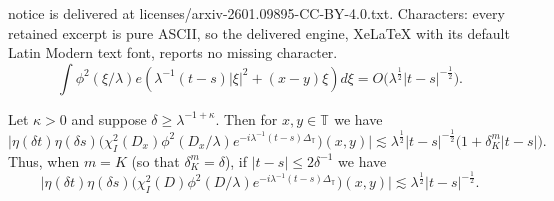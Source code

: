 \documentclass[10pt,a4paper]{amsart}
\newcommand{\T}[1][]{\mathbb{T}^#1}
\newcommand{\dK}[1]{\delta_{K}^{#1}}
\newcommand{\laplac}[1]{\Delta_{#1}}
\newcommand{\la}{\lambda}
\begin{document}
notice is delivered at licenses/arxiv-2601.09895-CC-BY-4.0.txt. Characters: every retained excerpt is pure ASCII, so the delivered engine, XeLaTeX with its default Latin Modern text font, reports no missing character.
\begin{equation} \label{stationary phase estimate for standard kernel}
    \int \phi^2(\xi/\la)e(\la^{-1}(t-s)|\xi|^2 +  (x-y) \xi)d \xi = O\big(\la^{\frac{1}{2}}|t-s|^{-\frac{1}{2}}\big).
\end{equation}

\begin{proposition}
Let $\kappa > 0$ and suppose $\delta \geq \la^{-1 + \kappa}$. Then for $x,y \in \T{}$ we have
\begin{equation} 
     \big|\eta(\delta t)\eta(\delta s)\big( \chi_{I}^{2}(D_x)\phi^2(D_x / \la)e^{-i\la^{-1}(t-s)\laplac{\T{}}} \big)(x,y)\big| \lesssim \la^{\frac{1}{2}}|t-s|^{-\frac{1}{2}}\big(1 + \dK{m}|t-s|\big).
\end{equation} 
Thus, when $m = K$ (so that $\dK{m} = \delta$), if $|t-s| \leq 2\delta^{-1}$ we have 
\begin{equation}
    \big|\eta(\delta t)\eta(\delta s)\big( \chi_{I}^{2}(D)\phi^2(D / \la)e^{-i\la^{-1}(t-s)\laplac{\T{}}} \big)(x,y) \big| \lesssim \la^{\frac{1}{2}}|t-s|^{-\frac{1}{2}}.
\end{equation}
\end{proposition}
\end{document}
